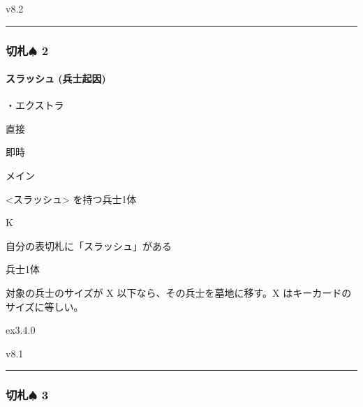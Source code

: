 \documentclass[letterpaper,10pt,dvipdfmx]{sphinxmanual}
\begin{document}
\sphinxAtStartPar
{}  v8.2


\bigskip\hrule\bigskip



\subsubsection{切札{\normalsize $\spadesuit$} 2}
\label{\detokenize{auto/frameActionlist:id16}}

\paragraph{スラッシュ (兵士起因)}
\label{\detokenize{auto/frameActionlist:act-slash}}\label{\detokenize{auto/frameActionlist:id17}}
\sphinxAtStartPar
{}

\sphinxAtStartPar
・エクストラ

\sphinxAtStartPar
{} 直接

\sphinxAtStartPar
{} 即時

\sphinxAtStartPar
{} メイン

\sphinxAtStartPar
{} \textless{}スラッシュ\textgreater{} を持つ兵士1体

\sphinxAtStartPar
{} K

\sphinxAtStartPar
{}

\sphinxAtStartPar
自分の表切札に「スラッシュ」がある

\sphinxAtStartPar
{}

\sphinxAtStartPar
兵士1体

\sphinxAtStartPar
{}

\sphinxAtStartPar
対象の兵士のサイズが X 以下なら、その兵士を墓地に移す。X はキーカードのサイズに等しい。

\sphinxAtStartPar
{}  ex3.4.0

\sphinxAtStartPar
{}  v8.1


\bigskip\hrule\bigskip



\subsubsection{切札{\normalsize $\spadesuit$} 3}
\label{\detokenize{auto/frameActionlist:id18}}
\end{document}
